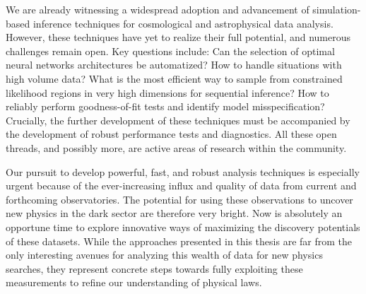 We are already witnessing a widespread adoption and advancement of simulation-based inference techniques for cosmological and astrophysical data analysis. However, these techniques have yet to realize their full potential, and numerous challenges remain open. Key questions include: Can the selection of optimal neural networks architectures be automatized? How to handle situations with high volume data? What is the most efficient way to sample from constrained likelihood regions in very high dimensions for sequential inference? How to reliably perform goodness-of-fit tests and identify model misspecification? Crucially, the further development of these techniques must be accompanied by the development of robust performance tests and diagnostics. All these open threads, and possibly more, are active areas of research within the community.

Our pursuit to develop powerful, fast, and robust analysis techniques is especially urgent because of the ever-increasing influx and quality of data from current and forthcoming observatories.
The potential for using these observations to uncover new physics in the dark sector are therefore very bright. Now is absolutely an opportune time to explore innovative ways of maximizing the discovery potentials of these datasets. While the approaches presented in this thesis are far from the only interesting avenues for analyzing this wealth of data for new physics searches, they represent concrete steps towards fully exploiting these measurements to refine our understanding of physical laws.





